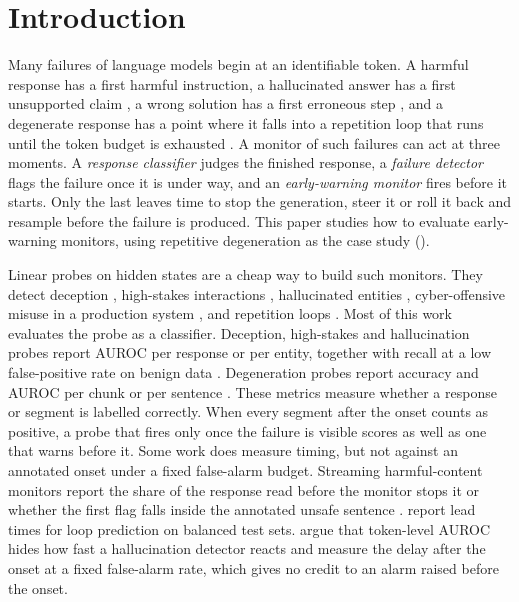 \section{Introduction}
\label{sec:introduction}

Many failures of language models begin at an identifiable token. A harmful
response has a first harmful instruction, a hallucinated answer has a first
unsupported claim \citep{niu2024ragtruth}, a wrong solution has a first
erroneous step \citep{zheng2025processbench}, and a degenerate response has a
point where it falls into a repetition loop that runs until the token budget is
exhausted \citep{holtzman2020curious,welleck2020neural,pipis2025wait}. A monitor
of such failures can act at three moments. A \emph{response classifier} judges
the finished response, a \emph{failure detector} flags the failure once it is
under way, and an \emph{early-warning monitor} fires before it starts. Only the
last leaves time to stop the generation, steer it
\citep{lee2025cast,hedstrom2025mera} or roll it back and resample
\citep{zhang2025backtracking} before the failure is produced. This paper studies
how to evaluate early-warning monitors, using repetitive degeneration as the
case study ().

Linear probes on hidden states are a cheap way to build such monitors. They
detect deception \citep{goldowskydill2025deception}, high-stakes interactions
\citep{mckenzie2025highstakes}, hallucinated entities
\citep{obeso2025realtime}, cyber-offensive misuse in a production system
\citep{kramar2026gemini}, and repetition loops
\citep{xie2025wordsalad,yu2025breaking,duan2026circular}. Most of this work
evaluates the probe as a classifier. Deception, high-stakes and hallucination
probes report AUROC per response or per entity, together with recall at a low
false-positive rate on benign data
\citep{goldowskydill2025deception,mckenzie2025highstakes,obeso2025realtime}.
Degeneration probes report accuracy and AUROC per chunk or per sentence
\citep{xie2025wordsalad,duan2026circular}. These metrics measure whether a
response or segment is labelled correctly. When every segment after the onset
counts as positive, a probe that fires only once the failure is visible scores
as well as one that warns before it. Some work does measure timing, but not
against an annotated onset under a fixed false-alarm budget. Streaming
harmful-content monitors report the share of the response read before the
monitor stops it \citep{li2025fineharm} or whether the first flag falls inside
the annotated unsafe sentence \citep{qwen2025qwen3guard}.
\citet{duan2026circular} report lead times for loop prediction on balanced
test sets. \citet{itkin2026quickest} argue that token-level AUROC hides how fast
a hallucination detector reacts and measure the delay after the onset at a
fixed false-alarm rate, which gives no credit to an alarm raised before the
onset.

